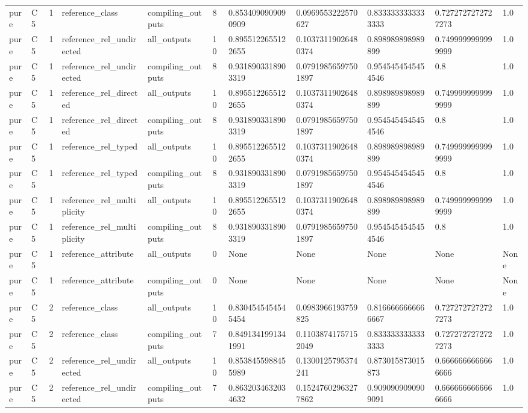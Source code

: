 \begin{tabular}{lllllllllll}
pure & C5 & 1 & reference\_class & compiling\_outputs & 8 & 0.8534090909090909 & 0.0969553222570627 & 0.8333333333333333 & 0.7272727272727273 & 1.0 \\
pure & C5 & 1 & reference\_rel\_undirected & all\_outputs & 10 & 0.8955122655122655 & 0.10373119026480374 & 0.898989898989899 & 0.7499999999999999 & 1.0 \\
pure & C5 & 1 & reference\_rel\_undirected & compiling\_outputs & 8 & 0.9318903318903319 & 0.07919856597501897 & 0.9545454545454546 & 0.8 & 1.0 \\
pure & C5 & 1 & reference\_rel\_directed & all\_outputs & 10 & 0.8955122655122655 & 0.10373119026480374 & 0.898989898989899 & 0.7499999999999999 & 1.0 \\
pure & C5 & 1 & reference\_rel\_directed & compiling\_outputs & 8 & 0.9318903318903319 & 0.07919856597501897 & 0.9545454545454546 & 0.8 & 1.0 \\
pure & C5 & 1 & reference\_rel\_typed & all\_outputs & 10 & 0.8955122655122655 & 0.10373119026480374 & 0.898989898989899 & 0.7499999999999999 & 1.0 \\
pure & C5 & 1 & reference\_rel\_typed & compiling\_outputs & 8 & 0.9318903318903319 & 0.07919856597501897 & 0.9545454545454546 & 0.8 & 1.0 \\
pure & C5 & 1 & reference\_rel\_multiplicity & all\_outputs & 10 & 0.8955122655122655 & 0.10373119026480374 & 0.898989898989899 & 0.7499999999999999 & 1.0 \\
pure & C5 & 1 & reference\_rel\_multiplicity & compiling\_outputs & 8 & 0.9318903318903319 & 0.07919856597501897 & 0.9545454545454546 & 0.8 & 1.0 \\
pure & C5 & 1 & reference\_attribute & all\_outputs & 0 & None & None & None & None & None \\
pure & C5 & 1 & reference\_attribute & compiling\_outputs & 0 & None & None & None & None & None \\
pure & C5 & 2 & reference\_class & all\_outputs & 10 & 0.8304545454545454 & 0.0983966193759825 & 0.8166666666666667 & 0.7272727272727273 & 1.0 \\
pure & C5 & 2 & reference\_class & compiling\_outputs & 7 & 0.8491341991341991 & 0.11038741757152049 & 0.8333333333333333 & 0.7272727272727273 & 1.0 \\
pure & C5 & 2 & reference\_rel\_undirected & all\_outputs & 10 & 0.8538455988455989 & 0.1300125795374241 & 0.873015873015873 & 0.6666666666666666 & 1.0 \\
pure & C5 & 2 & reference\_rel\_undirected & compiling\_outputs & 7 & 0.8632034632034632 & 0.15247602963277862 & 0.9090909090909091 & 0.6666666666666666 & 1.0 \\

\end{tabular}
